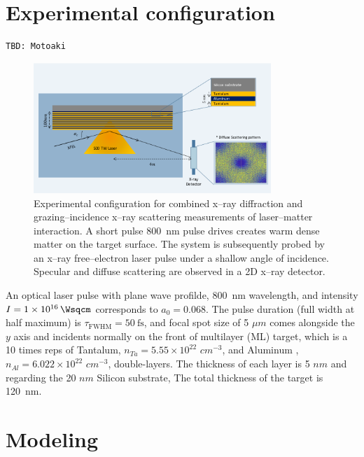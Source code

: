 \documentclass[preprint, 12pt]{elsarticle}
\begin{document}
\section{Experimental configuration\label{Experiment}}
\begin{verbatim}
TBD: Motoaki
\end{verbatim}
%
\begin{figure}[ht]
  \begin{center}
    \includegraphics[width=0.8\textwidth,angle=0,clip]{figures/experiment_setup.png}
  \end{center}
  \caption{Experimental configuration for combined x--ray diffraction and
    grazing--incidence x--ray scattering measurements of laser--matter
    interaction. A short pulse \SI{800}{\nm} pulse drives creates warm dense
    matter on the target surface. The system is subsequently probed by an x--ray
    free--electron laser pulse under a shallow angle of incidence. Specular and
    diffuse scattering are observed in a 2D x--ray detector.
  }
  \label{fig:experiment_setup}
\end{figure}
%
An optical laser pulse with plane wave profilde, \SI{800}{\nm} wavelength, and intensity $I =
\SI{1e16}{\Wsqcm}$ corresponds to $a_{0} = 0.068$. The pulse duration (full
width at half maximum) is $\tau_\text{FWHM}=\SI{50}{\fs}$, and focal spot size of 5 $\mu m$  comes
alongside the $y$ axis and incidents normally on the front of multilayer (ML)
target, which is a 10 times reps of Tantalum, $n_{Ta} = 5.55 \times 10^{22}$
$cm^{-3}$, and Aluminum ,$n_{Al} = 6.022 \times 10^{22}$ $cm^{-3}$,
double-layers. The thickness of each layer is 5 $nm$ and regarding the 20 $nm$
Silicon substrate,
The total thickness of the target is \SI{120}{\nm}.
%
\section{Modeling\label{sec:Theory}}
\end{document}
